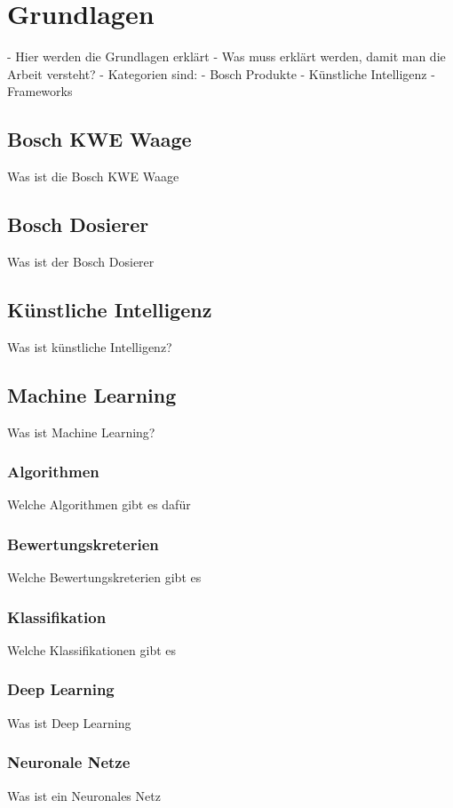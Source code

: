 \chapter{Grundlagen}
\label{ch:grundlagen}
- Hier werden die Grundlagen erklärt
- Was muss erklärt werden, damit man die Arbeit versteht?
- Kategorien sind:
- Bosch Produkte
- Künstliche Intelligenz
- Frameworks

\section{Bosch KWE Waage}
Was ist die Bosch KWE Waage

\section{Bosch Dosierer}
Was ist der Bosch Dosierer

\section{Künstliche Intelligenz}
Was ist künstliche Intelligenz?

\section{Machine Learning}
Was ist Machine Learning?

\subsection{Algorithmen}
Welche Algorithmen gibt es dafür

\subsection{Bewertungskreterien}
Welche Bewertungskreterien gibt es

\subsection{Klassifikation}
Welche Klassifikationen gibt es

\subsection{Deep Learning}
Was ist Deep Learning

\subsection{Neuronale Netze}
Was ist ein Neuronales Netz

